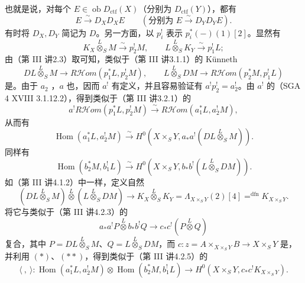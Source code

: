 也就是说，对每个 $E\in\operatorname{ob}D_{\mathrm{ctf}}(X)$（分别为 $D_{\mathrm{ctf}}(Y)$），都有
\[
 E\xrightarrow{\sim}D_XD_XE\qquad
 (\text{分别为 }E\xrightarrow{\sim}D_YD_YE).
\]
有时将 $D_X,D_Y$ 简记为 $D$。另一方面，以 $p_i^!$ 表示 $p_i^*(-)(1)[2]$。显然有
\[
 K_X\overset L\otimes_S M\xrightarrow{\sim}p_2^!M,\qquad
 L\overset L\otimes_S K_Y\xrightarrow{\sim}p_1^!L;
\]
由（第 III 讲2.3）取可知，类似于（第 III 讲3.1.1）的 Künneth 
\[
 DL\overset L\otimes_S M\longrightarrow R\mathcal Hom(p_1^*L,p_2^!M),\qquad
 L\overset L\otimes_S DM\longrightarrow R\mathcal Hom(p_2^*M,p_1^!L)
\]
是。由于 $a_2$ ，$a$ 也，因而 $a^!$ 有定义，并且容易验证有 $a^!p_2^!=a_2^!$。由 $a^!$ 的（SGA 4 XVIII 3.1.12.2），得到类似于（第 III 讲3.2.1）的
\[
 a^!R\mathcal Hom(p_1^*L,p_2^!M)\xrightarrow{\sim}R\mathcal Hom(a_1^*L,a_2^!M),
\]
从而有
\[
 \operatorname{Hom}(a_1^*L,a_2^!M)\xrightarrow{\sim}
 H^0(X\times_S Y,a_*a^!(DL\overset L\otimes_S M)).\tag{$*$}
\]
同样有
\[
 \operatorname{Hom}(b_2^*M,b_1^!L)\xrightarrow{\sim}
 H^0(X\times_S Y,b_*b^!(L\overset L\otimes_S DM)).\tag{$**$}
\]
如（第 III 讲4.1.2）中一样，定义自然
\[
 (DL\overset L\otimes_S M)\overset L\otimes(L\overset L\otimes_S DM)
 \longrightarrow K_X\overset L\otimes_S K_Y
 =\Lambda_{X\times_S Y}(2)[4]\mathrel{\mathop=^{\mathrm{dfn}}}K_{X\times_S Y}.
\]
将它与类似于（第 III 讲4.2.3）的
\[
 a_*a^!P\overset L\otimes b_*b^!Q\longrightarrow c_*c^!(P\overset L\otimes Q)
\]
复合，其中 $P=DL\overset L\otimes_S M$、$Q=L\overset L\otimes_S DM$，而 $c:z=A\times_{X\times_S Y}B\to X\times_S Y$ 是，并利用 $(*)$、$(**)$，得到类似于（第 III 讲4.2.5）的
\[
 \langle\ ,\ \rangle:\operatorname{Hom}(a_1^*L,a_2^!M)\otimes
 \operatorname{Hom}(b_2^*M,b_1^!L)\longrightarrow
 H^0(X\times_S Y,c_*c^!K_{X\times_S Y}).
\]

